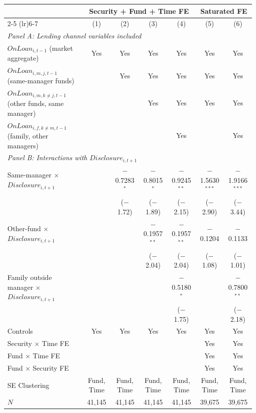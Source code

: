 {\small
\begin{tabular}{l*{6}{c}}
\toprule
 & \multicolumn{4}{c}{Security + Fund + Time FE} & \multicolumn{2}{c}{Saturated FE} \\
\cmidrule(lr){2-5} \cmidrule(lr){6-7}
 & (1) & (2) & (3) & (4) & (5) & (6) \\
\midrule
\multicolumn{7}{l}{\textit{Panel A: Lending channel variables included}} \\[0.3em]
$\mathit{OnLoan}_{i,t-1}$ (market aggregate) & Yes & Yes & Yes & Yes & Yes & Yes \\[0.3em]
$\mathit{OnLoan}_{i,m,j,t-1}$ (same-manager funds) & & Yes & Yes & Yes & Yes & Yes \\[0.3em]
$\mathit{OnLoan}_{i,m,k\neq j,t-1}$ (other funds, same manager) & & & Yes & Yes & Yes & Yes \\[0.3em]
$\mathit{OnLoan}_{i,f,k\neq m,t-1}$ (family, other managers) & & & & Yes & & Yes \\
\midrule
\multicolumn{7}{l}{\textit{Panel B: Interactions with $\mathit{Disclosure}_{i,t+1}$}} \\[0.3em]
Same-manager $\times$ $\mathit{Disclosure}_{i,t+1}$ & & $-$0.7283$^{*}$ & $-$0.8015$^{*}$ & $-$0.9245$^{**}$ & $-$1.5630$^{***}$ & $-$1.9166$^{***}$ \\
 & & ($-$1.72) & ($-$1.89) & ($-$2.15) & ($-$2.90) & ($-$3.44) \\[0.3em]
Other-fund $\times$ $\mathit{Disclosure}_{i,t+1}$ & & & $-$0.1957$^{**}$ & $-$0.1957$^{**}$ & $-$0.1204 & $-$0.1133 \\
 & & & ($-$2.04) & ($-$2.04) & ($-$1.08) & ($-$1.01) \\[0.3em]
Family outside manager $\times$ $\mathit{Disclosure}_{i,t+1}$ & & & & $-$0.5180$^{*}$ & & $-$0.7800$^{**}$ \\
 & & & & ($-$1.75) & & ($-$2.18) \\
\midrule
Controls & Yes & Yes & Yes & Yes & Yes & Yes \\
\midrule
Security $\times$ Time FE & & & & & Yes & Yes \\
Fund $\times$ Time FE & & & & & Yes & Yes \\
Fund $\times$ Security FE & & & & & Yes & Yes \\
\midrule
SE Clustering & Fund, Time & Fund, Time & Fund, Time & Fund, Time & Fund, Time & Fund, Time \\
$N$ & 41,145 & 41,145 & 41,145 & 41,145 & 39,675 & 39,675 \\
\bottomrule
\end{tabular}
}
